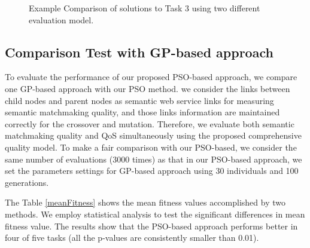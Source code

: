 \documentclass{llncs}
\begin{document}
\begin{figure}[h]
 \caption{Example Comparison of solutions to Task 3 using two different evaluation model.}
 \label{comparisontest}
\end{figure}

\subsection{Comparison Test with GP-based approach}\label{comparisonTestWithGP}
To evaluate the performance of our proposed PSO-based approach, we compare one GP-based approach  \cite{ma2015hybrid} with our PSO method. we consider the links between child nodes and parent nodes as semantic web service links for measuring  semantic matchmaking quality, and those links information are maintained correctly for the crossover and mutation. Therefore, we evaluate both semantic matchmaking quality and QoS simultaneously using the proposed comprehensive quality model. To make a fair comparison with our PSO-based, we consider the same number of evaluations (3000 times) as that in our PSO-based approach, we set the parameters settings for GP-based approach \cite{ma2015hybrid} using 30 individuals and 100 generations.

The Table \ref{meanFitness} shows the mean fitness values accomplished by two methods. We employ statistical analysis to test the significant differences in mean fitness value. The results show that the PSO-based approach performs better in four of five tasks (all the p-values are consistently smaller than 0.01).
\end{document}
